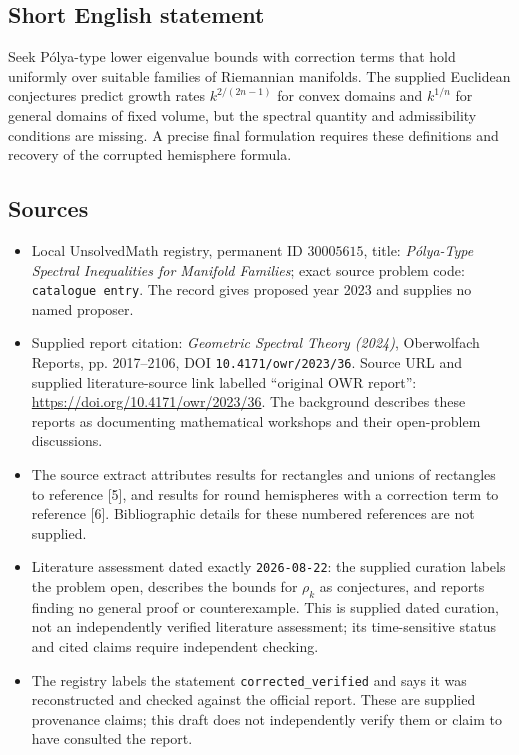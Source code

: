 \documentclass[11pt]{article}
\begin{document}
\subsection{Short English statement}
Seek P\'olya-type lower eigenvalue bounds with correction terms that hold uniformly over suitable families of Riemannian manifolds. The supplied Euclidean conjectures predict growth rates \(k^{2/(2n-1)}\) for convex domains and \(k^{1/n}\) for general domains of fixed volume, but the spectral quantity and admissibility conditions are missing. A precise final formulation requires these definitions and recovery of the corrupted hemisphere formula.
\subsection{Sources}
\begin{itemize}
\item Local UnsolvedMath registry, permanent ID \(30005615\), title: \emph{P\'olya-Type Spectral Inequalities for Manifold Families}; exact source problem code: \texttt{catalogue entry}. The record gives proposed year 2023 and supplies no named proposer.
\item Supplied report citation: \emph{Geometric Spectral Theory (2024)}, Oberwolfach Reports, pp. 2017--2106, DOI \texttt{10.4171/owr/2023/36}. Source URL and supplied literature-source link labelled ``original OWR report'': \url{https://doi.org/10.4171/owr/2023/36}. The background describes these reports as documenting mathematical workshops and their open-problem discussions.
\item The source extract attributes results for rectangles and unions of rectangles to reference [5], and results for round hemispheres with a correction term to reference [6]. Bibliographic details for these numbered references are not supplied.
\item Literature assessment dated exactly \texttt{2026-08-22}: the supplied curation labels the problem open, describes the bounds for \(\rho_k\) as conjectures, and reports finding no general proof or counterexample. This is supplied dated curation, not an independently verified literature assessment; its time-sensitive status and cited claims require independent checking.
\item The registry labels the statement \texttt{corrected\_verified} and says it was reconstructed and checked against the official report. These are supplied provenance claims; this draft does not independently verify them or claim to have consulted the report.
\end{itemize}
\end{document}
